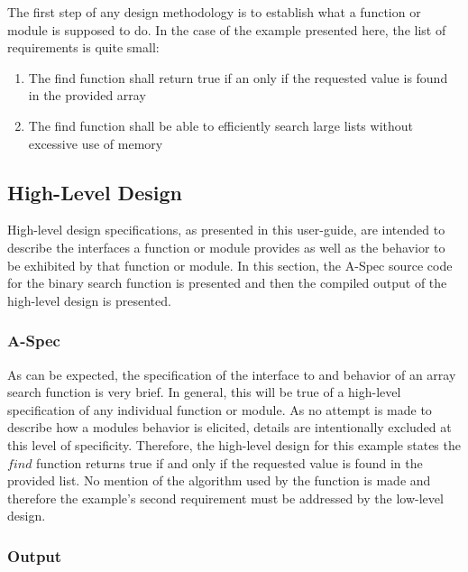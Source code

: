 \documentclass[letterpaper,10pt,draft]{book}
\begin{document}
The first step of any design methodology is to establish what a function or module
is supposed to do.  In the case of the example presented here, the list of requirements
is quite small:

\begin{enumerate}
  \item The find function shall return true if an only if the requested value is found in the provided array
  \item The find function shall be able to efficiently search large lists without excessive use of memory
\end{enumerate}

\subsection{High-Level Design}
   \label{sect:FirstExHLD}

High-level design specifications, as presented in this user-guide, are intended
to describe the interfaces a function or module provides as well as the behavior
to be exhibited by that function or module.  In this section, the A-Spec source
code for the binary search function is presented and then the compiled output of
the high-level design is presented.

\subsubsection{A-Spec}
   \label{sect:FirstExHLDA}



As can be expected, the specification of the interface to and behavior of an array
search function is very brief.  In general, this will be true of a high-level specification
of any individual function or module.  As no attempt is made to describe how a modules
behavior is elicited, details are intentionally excluded at this level of specificity.
Therefore, the high-level design for this example states the $find$ function returns
true if and only if the requested value is found in the provided list.  No mention
of the algorithm used by the function is made and therefore the example's second
requirement must be addressed by the low-level design.

\newpage
\subsubsection{Output}
   \label{sect:FirstExHLDZ}
\end{document}
